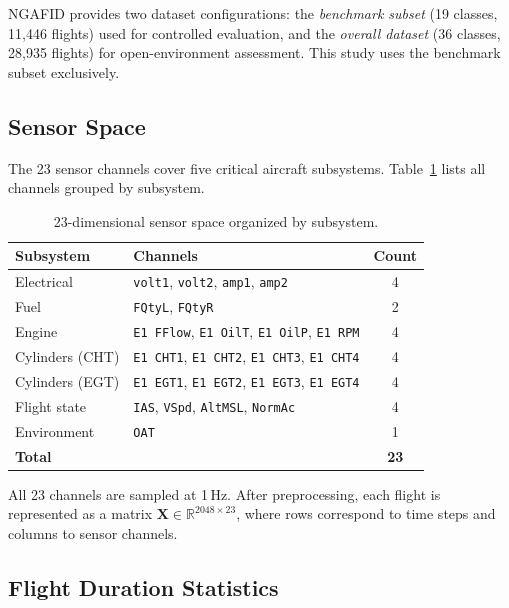 NGAFID provides two dataset configurations: the \textit{benchmark subset}
(19 classes, 11{,}446 flights) used for controlled evaluation, and the
\textit{overall dataset} (36 classes, 28{,}935 flights) for open-environment
assessment. This study uses the benchmark subset exclusively.

\subsection{Sensor Space}

The 23 sensor channels cover five critical aircraft subsystems.
Table~\ref{tab:sensors} lists all channels grouped by subsystem.

\begin{table}[H]
    \centering
    \caption{23-dimensional sensor space organized by subsystem.}
    \label{tab:sensors}
    \begin{tabular}{llc}
        \toprule
        \textbf{Subsystem} & \textbf{Channels} & \textbf{Count} \\
        \midrule
        Electrical   & \texttt{volt1}, \texttt{volt2}, \texttt{amp1}, \texttt{amp2} & 4 \\
        Fuel         & \texttt{FQtyL}, \texttt{FQtyR} & 2 \\
        Engine       & \texttt{E1 FFlow}, \texttt{E1 OilT}, \texttt{E1 OilP}, \texttt{E1 RPM} & 4 \\
        Cylinders (CHT) & \texttt{E1 CHT1}, \texttt{E1 CHT2}, \texttt{E1 CHT3}, \texttt{E1 CHT4} & 4 \\
        Cylinders (EGT) & \texttt{E1 EGT1}, \texttt{E1 EGT2}, \texttt{E1 EGT3}, \texttt{E1 EGT4} & 4 \\
        Flight state & \texttt{IAS}, \texttt{VSpd}, \texttt{AltMSL}, \texttt{NormAc} & 4 \\
        Environment  & \texttt{OAT} & 1 \\
        \midrule
        \textbf{Total} & & \textbf{23} \\
        \bottomrule
    \end{tabular}
\end{table}

All 23 channels are sampled at 1\,Hz. After preprocessing, each flight is
represented as a matrix $\mathbf{X} \in \mathbb{R}^{2048 \times 23}$, where
rows correspond to time steps and columns to sensor channels.

\subsection{Flight Duration Statistics}

